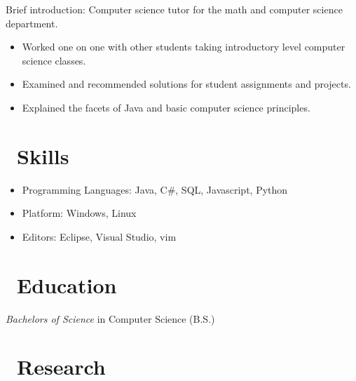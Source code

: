 \documentclass{resume}
\begin{document}

Brief introduction: Computer science tutor for the math and computer science department.
\begin{itemize}
  \item Worked one on one with other students taking introductory level computer science classes.
  \item Examined and recommended solutions for student assignments and projects.
  \item Explained the facets of Java and basic computer science principles.
\end{itemize}

\section{\faCogs\ Skills}
\begin{itemize}[parsep=0.5ex]
  \item Programming Languages: Java, C\#, SQL, Javascript, Python
  \item Platform: Windows, Linux
  \item Editors: Eclipse, Visual Studio, vim
\end{itemize}


\section{\faGraduationCap\ Education}
\textit{Bachelors of Science} in Computer Science (B.S.)

\section{\faFlask\ Research}



%
%
\end{document}
